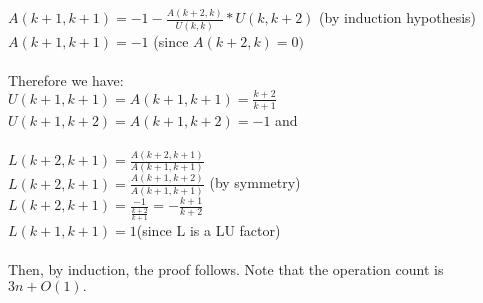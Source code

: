 \documentclass{article}
\DeclareMathOperator{\1}{\mathit{1}}
\numberwithin{figure}{section} %
\numberwithin{table}{section}
\begin{document}
\indent \(A(k+1,k+1)= -1 - \frac{A(k+2,k)}{U(k,k)}*U(k,k+2) \) \indent (by induction hypothesis)\\
\indent \(A(k+1,k+1)= -1 \) \indent  (since \(A(k+2,k)=0)\)\\\\
Therefore we have:\\
\indent \(U(k+1,k+1) = A(k+1,k+1) = \frac{k+2}{k+1}\)\\
\indent \(U(k+1,k+2)=A(k+1,k+2) = -1\) \indent and \\\\
\indent \(L(k+2,k+1) = \frac{A(k+2,k+1)}{A(k+1,k+1)}\)\\
\indent \(L(k+2,k+1) = \frac{A(k+1,k+2)}{A(k+1,k+1)}\) \indent (by symmetry)\\
\indent \(L(k+2,k+1) = \frac{-1}{\frac{k+2}{k+1}} = -\frac{k+1}{k+2}\)\\
\indent \(L(k+1,k+1)=1 \)\indent (since L is a LU factor)\\\\
Then, by induction, the proof follows. Note that the operation count is \(3n + O(1).\)

\newpage{}
\end{document}
